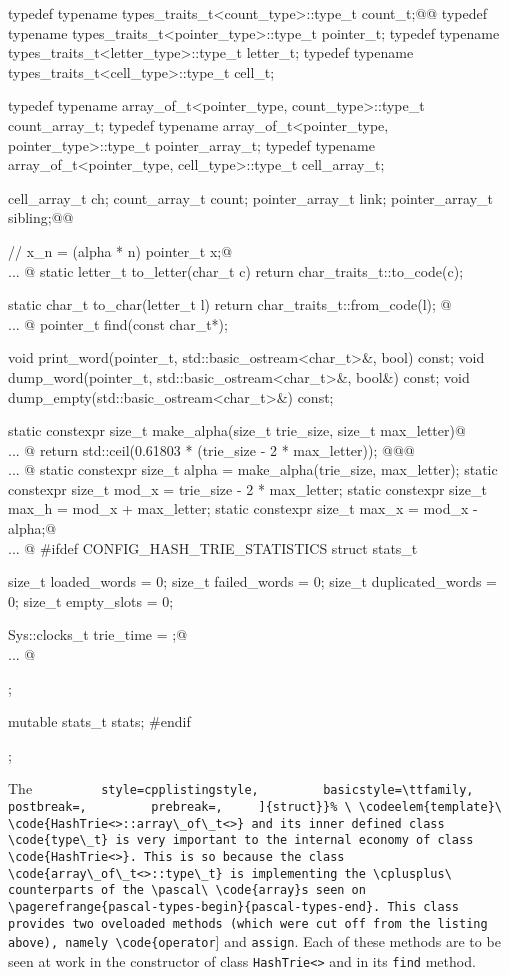 \documentclass[a4paper,11pt]{article}
\makeatletter
\renewcommand{\=}{\protect\nobreakdash-\hspace{0pt}}
\renewcommand{\~}{\protect\nobreakdash--\hspace{0pt}}
\newcommand{\plusplus}{\textbf{\raisebox{1pt}{++}}}
\newcommand{\cplusplus}{$C\plusplus$}
\newcommand{\pascal}{\code{Pascal}}
\newcommand{\code}[1]{{\tt{#1}}}
\newcommand\code*[1]{\mbox{\code{#1}}}
\let\lst@ifskiplines\iffalse
\newcommand\skipnumbering[1]{%
	\setcounter{lstnumber}{\numexpr#1-1\relax}%
	\let\lst@ifskiplines\iftrue
	\\\lst@PlaceNumber
	\let\lst@ifskiplines\iffalse
	\lst@ifshowskiplines...\fi
}
\let\lst@PlaceNumber\@empty
\newcommand{\cppinline}[1]{%
	{\lstinline[
		style=cpplistingstyle,
		basicstyle=\ttfamily,
		postbreak=,
		prebreak=,
	]{#1}}%
}
\newcommand{\codeelem}[1]{#1}
\newcommand{\struct}{\code{struct}}%
\newcommand{\structtempl}{\struct\ \codeelem{template}}%
\renewcommand{\codeelem}[1]{\emph{##1}}%
\renewcommand{\struct}{\cppinline{struct}}%
\newcommand{\pagerefrange}[2]{%
	\vpagerefrange{#1}{#2}}
\newcommand{\pagerefrange}[2]{}
\makeatother
\begin{document}
\begin{hashtrielisting}[1983]
{	typedef typename types_traits_t<count_type>::type_t   count_t;@\label{cpp-types-first-line}@
	typedef typename types_traits_t<pointer_type>::type_t pointer_t;
	typedef typename types_traits_t<letter_type>::type_t  letter_t;
	typedef typename types_traits_t<cell_type>::type_t    cell_t;

	typedef
		typename array_of_t<pointer_type, count_type>::type_t
		count_array_t;
	typedef
		typename array_of_t<pointer_type, pointer_type>::type_t
		pointer_array_t;
	typedef
		typename array_of_t<pointer_type, cell_type>::type_t
		cell_array_t;

	cell_array_t    ch;
	count_array_t   count;
	pointer_array_t link;
	pointer_array_t sibling;@\label{cpp-types-last-line}@

	// x_n = (alpha * n) %
	pointer_t x;@\skipnumbering{2217}@
	static letter_t to_letter(char_t c)
	{ return char_traits_t::to_code(c); }

	static char_t to_char(letter_t l)
	{ return char_traits_t::from_code(l); }  @\skipnumbering{2226}@
	pointer_t find(const char_t*);

	void print_word(pointer_t, std::basic_ostream<char_t>&, bool) const;
	void dump_word(pointer_t, std::basic_ostream<char_t>&, bool&) const;
	void dump_empty(std::basic_ostream<char_t>&) const;

	static constexpr size_t make_alpha(size_t trie_size, size_t max_letter)@\skipnumbering{2236}@
	{ return std::ceil(0.61803 * (trie_size - 2 * max_letter)); }@\label{cpp-make-alpha-expr}@@\skipnumbering{2243}@
	static constexpr size_t alpha = make_alpha(trie_size, max_letter);
	static constexpr size_t mod_x = trie_size - 2 * max_letter;
	static constexpr size_t max_h = mod_x + max_letter;
	static constexpr size_t max_x = mod_x - alpha;@\skipnumbering{2258}@
#ifdef CONFIG_HASH_TRIE_STATISTICS
	struct stats_t
	{
		size_t loaded_words = 0;
		size_t failed_words = 0;
		size_t duplicated_words = 0;
		size_t empty_slots = 0;

		Sys::clocks_t trie_time = {};@\skipnumbering{2269}@
	};

	mutable stats_t stats;
#endif
};
\end{hashtrielisting}
%
The \structtempl\ \code{HashTrie<>::array\_of\_t<>} and its inner defined class
\code{type\_t} is very important to the internal economy of class \code{HashTrie<>}.
This is so because the class \code{array\_of\_t<>::type\_t} is implementing
the \cplusplus\ counterparts of the \pascal\ \code{array}s seen on  
\pagerefrange{pascal-types-begin}{pascal-types-end}. This class provides two
oveloaded methods (which were cut off from the listing above), namely
\code{operator[]} and \code{assign}. Each of these methods are to be seen
at work in the constructor of class \code{HashTrie<>} and in its \code{find}
method.
\end{document}
